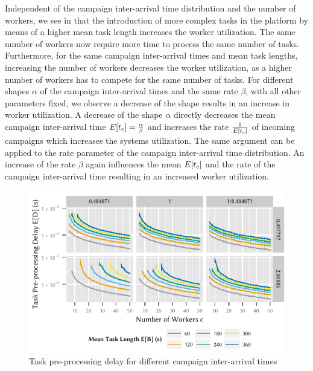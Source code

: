 Independent of the campaign inter-arrival time distribution and the number of workers, we see in  that the introduction of more complex tasks in the platform by means of a higher mean task length \meanTaskLength increases the worker utilization.
The same number of workers now require more time to process the same number of tasks.
Furthermore, for the same campaign inter-arrival times and mean task lengths, increasing the number of workers decreases the worker utilization, as a higher number of workers has to compete for the same number of tasks.
For different shapes \(\alpha\) of the campaign inter-arrival times and the same rate \(\beta\), with all other parameters fixed, we observe a decrease of the shape results in an increase in worker utilization.
A decrease of the shape \(\alpha\) directly decreases the mean campaign inter-arrival time \(E[t_c]=\frac{\alpha}{\beta}\) and increases the rate \(\frac{1}{E[t_c]}\) of incoming campaigns which increases the systems utilization. 
The same argument can be applied to the rate parameter of the campaign inter-arrival time distribution. An increase of the rate \(\beta\) again influences the mean \(E[t_c]\) and the rate of the campaign inter-arrival time resulting in an increased worker utilization.

\begin{figure}
	\centering
	\includegraphics{cloud/crowdsourcing/numerical_evaluation/figures/parameter_task_delay}
	\caption{Task pre-processing delay for different campaign inter-arrival times}
	\label{fig:cloud:crowdsourcing:performance_evaluation:distributions:parameter_task_delay}
\end{figure}

